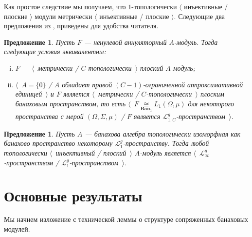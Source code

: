 \documentclass[12pt]{article}
\newtheorem{proposition}[theorem]{Предложение}
\newcommand{\isom}[1]{\mathop{\mathbin{\cong}}\limits_{#1}}
\begin{document}
Как простое следствие мы получаем, что $1$-топологически $\langle$ инъективные / плоские $\rangle$ модули метрически $\langle$ инъективные / плоские $\rangle$. Следующие два предложения из \cite{NemGeomProjInjFlatBanMod}, приведены для удобства читателя.
\begin{proposition}\label{MetTopFlatAnnihModCharac} Пусть $F$ --- ненулевой аннуляторный $A$-модуль. Тогда следующие условия эквивалентны:
\begin{enumerate}[i)]
\item $F$ --- $\langle$~метрически / $C$-топологически~$\rangle$ плоский $A$-модуль;
\item $\langle$~$A=\{0\}$ / $A$ обладает правой $(C-1)$-ограниченной аппроксимативной единицей~$\rangle$ и $F$ является $\langle$~метрически / $C$-топологически~$\rangle$ плоским банаховым пространством, то есть $\langle$~$F\isom{\mathbf{Ban}_1}L_1(\Omega,\mu)$ для некоторого пространства с мерой $(\Omega, \Sigma, \mu)$ / $F$ является $\mathcal{L}_{1,C}^g$-пространством~$\rangle$.
\end{enumerate}
\end{proposition}

\begin{proposition}\label{TopProjInjFlatModOverMthscrL1SpCharac} Пусть $A$ --- банахова алгебра топологически изоморфная как банахово пространство некоторому $\mathcal{L}_1^g$-пространству. Тогда любой топологически $\langle$~инъективный / плоский~$\rangle$ $A$-модуль является $\langle$~$\mathcal{L}_\infty^g$-пространством / $\mathcal{L}_1^g$-пространством~$\rangle$.
\end{proposition}


\section{Основные результаты}
\label{SectionMainResults}

Мы начнем изложение с технической леммы о структуре сопряженных банаховых модулей.
\end{document}
